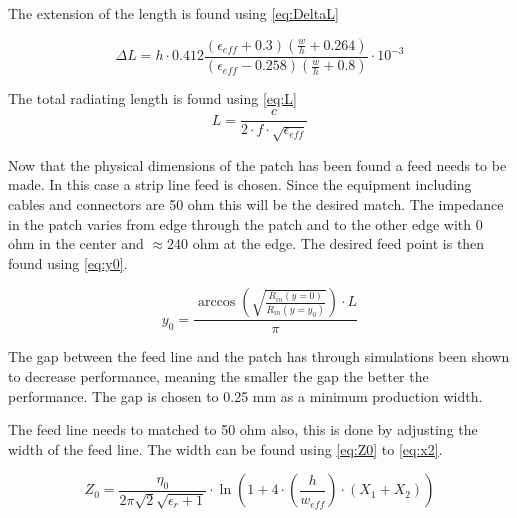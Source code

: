 The extension of the length is found using \autoref{eq:DeltaL}

\begin{equation}\label{eq:DeltaL}
\Delta L = h\cdot0.412 \frac{(\epsilon_{eff}+0.3)\left(\frac{w}{h}+0.264\right)}{(\epsilon_{eff}-0.258)\left(\frac{w}{h}+0.8\right)}\cdot 10^{-3}
\end{equation}

The total radiating length is found using \autoref{eq:L}
\begin{equation}\label{eq:L}
L = \frac{c}{2\cdot f\cdot\sqrt{\epsilon_{eff}}}
\end{equation}

Now that the physical dimensions of the patch has been found a feed needs to be made. In this case a strip line feed is chosen. Since the equipment including cables and connectors are 50 ohm this will be the desired match. The impedance in the patch varies from edge through the patch and to the other edge with 0 ohm in the center and $\approx 240$ ohm at the edge. The desired feed point is then found using \autoref{eq:y0}. 

\begin{equation}\label{eq:y0}
y_0 = \frac{\arccos\left(\sqrt{\frac{R_{in}(y=0)}{R_{in}(y=y_0)}}\right)\cdot L}{\pi}
\end{equation}
\begin{where}
\end{where}

The gap between the feed line and the patch has through simulations been shown to decrease performance, meaning the smaller the gap the better the performance. The gap is chosen to 0.25 mm as a minimum production width. 

The feed line needs to matched to 50 ohm also, this is done by adjusting the width of the feed line. The width can be found using \autoref{eq:Z0} to \autoref{eq:x2}.

\begin{equation}\label{eq:Z0}
Z_0=\frac{\eta_0}{2\pi\sqrt{2}\sqrt{\epsilon_r+1}}\cdot \ln\left(1+4\cdot \left(\frac{h}{w_{eff}}\right)\cdot (X_1+X_2)\right)
\end{equation}
\begin{where}
\end{where}


